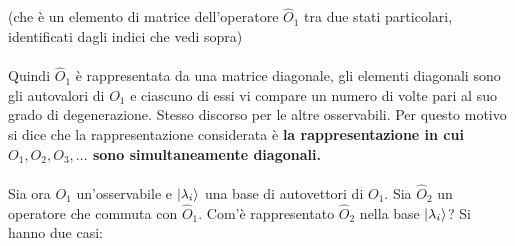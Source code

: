 	(che è un elemento di matrice dell'operatore $\hat{O}_1$ tra due stati particolari, identificati dagli indici che vedi sopra)
	\\
	\\
	Quindi $\hat{O}_1$ è rappresentata da una matrice diagonale, gli elementi diagonali sono gli autovalori di $O_1$ e ciascuno di essi vi compare un numero di volte pari al suo grado di degenerazione. Stesso discorso per le altre osservabili. Per questo motivo si dice che la rappresentazione considerata è \textbf{la rappresentazione in cui $O_1, O_2, O_3, \ldots$ sono simultaneamente diagonali.}
	\\
	\\
	Sia ora $O_1$ un'osservabile e $\ket{\lambda_i}$ una base di autovettori di $O_1$. Sia $\hat{O}_2$ un operatore che commuta con $\hat{O}_1$. Com'è rappresentato $\hat{O}_2$ nella base $\ket{\lambda_i}$? Si hanno due casi:
	
